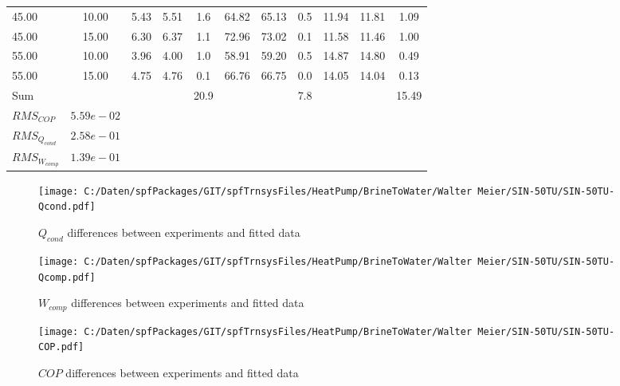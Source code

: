 \documentclass[english]{SPFShortReport}
\begin{document}
\begin{table}[!ht]
\begin{small}
\begin{center}
{\begin{tabular}{l | c c c c c c c c c c }
45.00  & 10.00 & 5.43 & 5.51 & 1.6 & 64.82 & 65.13 & 0.5 & 11.94 & 11.81 & 1.09\\ 
45.00  & 15.00 & 6.30 & 6.37 & 1.1 & 72.96 & 73.02 & 0.1 & 11.58 & 11.46 & 1.00\\ 
55.00  & 10.00 & 3.96 & 4.00 & 1.0 & 58.91 & 59.20 & 0.5 & 14.87 & 14.80 & 0.49\\ 
55.00  & 15.00 & 4.75 & 4.76 & 0.1 & 66.76 & 66.75 & 0.0 & 14.05 & 14.04 & 0.13\\ 
\hline 
 Sum &  & &  & 20.9 &  &  & 7.8 & &  & 15.49\\ 
\hline 
 $RMS_{COP}$ & $5.59e-02$ \\ 
 $RMS_{Q_{cond}}$ & $2.58e-01$ \\ 
 $RMS_{W_{comp}}$ & $1.39e-01$ \\ 
\hline
\hline
\end{tabular}
}
\label{ErrorsTable}
\end{center}
\end{small}
\end{table}
\begin{figure}[!ht]
\begin{center}
\texttt{[image: C:/Daten/spfPackages/GIT/spfTrnsysFiles/HeatPump/BrineToWater/Walter Meier/SIN-50TU/SIN-50TU-Qcond.pdf]}
\caption{$Q_{cond}$ differences between experiments and fitted data}
\label{QcongFig}
\end{center}
\end{figure}
\begin{figure}[!ht]
\begin{center}
\texttt{[image: C:/Daten/spfPackages/GIT/spfTrnsysFiles/HeatPump/BrineToWater/Walter Meier/SIN-50TU/SIN-50TU-Qcomp.pdf]}
\caption{$W_{comp}$ differences between experiments and fitted data}
\label{QcompFig}
\end{center}
\end{figure}
\begin{figure}[!ht]
\begin{center}
\texttt{[image: C:/Daten/spfPackages/GIT/spfTrnsysFiles/HeatPump/BrineToWater/Walter Meier/SIN-50TU/SIN-50TU-COP.pdf]}
\caption{$COP$ differences between experiments and fitted data}
\label{COPFig}
\end{center}
\end{figure}
\end{document}
